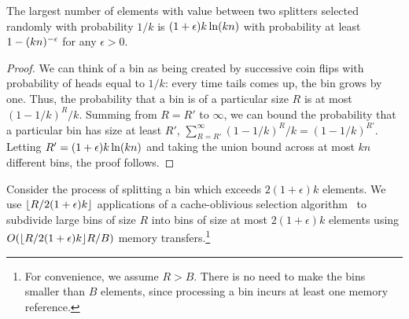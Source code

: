 \begin{lemma}
  The largest number of elements with value between two splitters selected randomly 
  with probability $1/k$ is $(1+\epsilon)k\ln \mathopen{}\left(kn\right)\mathclose{}$ with probability at least 
  $1 - \mathopen{}\left(kn\right)\mathclose{}^{-\epsilon}$ for any $\epsilon > 0$.
  \label{lem:max_R}
\end{lemma}
\begin{proof}
  We can think of a bin as being created by successive coin flips with probability
  of heads equal to $1/k$: every time tails comes up, the bin grows by one.  Thus,
  the probability that a bin is of a particular size $R$ is at most $(1-1/k)^R / k$.
  Summing from $R=R'$ to $\infty$, we can bound the probability that a particular
  bin has size at least $R'$, $\sum_{R=R'}^{\infty}(1-1/k)^R/k = (1-1/k)^{R'}$.
  Letting $R'=(1+\epsilon)k\ln \mathopen{}\left(kn\right)\mathclose{}$ and taking the union bound across at most $kn$
  different bins, the proof follows.
\end{proof}

Consider the process of splitting a bin which exceeds $2(1+\epsilon)k$ elements.  We use 
$\mathopen{}\left\lfloor R/2(1+\epsilon)k \right\rfloor\mathclose{}$ applications of a cache-oblivious selection 
algorithm~\cite{FrigoLePr99} to subdivide large bins of size $R$ into bins of 
size at most $2(1+\epsilon)k$ elements using $O(\mathopen{}\left\lfloor R/2(1+\epsilon)k \right\rfloor\mathclose{} R/B)$ 
memory transfers.\footnote{For
convenience, we assume $R>B$.  There is no need to make the bins smaller than $B$
elements, since processing a bin incurs at least one memory reference.}

